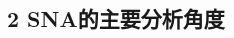 \documentclass[11pt]{beamer}
\begin{document}
\begin{CJK}{UTF8}{gbsn}
%
%
%
%
%
%
%
%
%


\section{2 SNA的主要分析角度}


\end{CJK}
\end{document}
